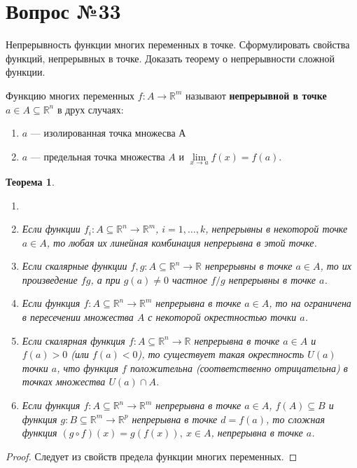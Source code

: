 \documentclass[12pt]{report}
\numberwithin{equation}{section}
\newtheorem{theorem}{Теорема}[section]
\begin{document}
\newpage \section{Вопрос №33} %
\begin{framed}
Непрерывность функции многих переменных в точке. Сформулировать свойства функций, непрерывных в точке. Доказать теорему о непрерывности сложной функции.
\end{framed}

Функцию многих переменных $f : A \to \mathbb{R}^m$ называют \textbf{непрерывной в точке} $a \in A \subseteq \mathbb{R}^n$ в друх случаях:
\begin{enumerate}
\item[1)] $a$ --- изолированная точка множесва А
\item[2)] $a$ --- предельная точка множества $A$ и $\lim\limits_{x \to a}f(x) = f(a).$
\end{enumerate}

\begin{theorem} \label{th:33:1}
\begin{enumerate}
\item[]
\item[а)] Если функции $f_i : A \subseteq \mathbb{R}^n \to \mathbb{R}^m$, $i = 1, \ldots, k$, непрерывны в некоторой точке $a \in A$, то любая их линейная комбинация непрерывна в этой точке.
\item[б)] Если скалярные функции $f,g : A \subseteq \mathbb{R}^n \to \mathbb{R}$ непрерывны в точке $a \in A$, то их произведение $fg$, а при $g(a) \neq 0$ частное $f/g$ непрерывны в точке $a$. 
\item[в)] Если функция $f : A \subseteq \mathbb{R}^n \to \mathbb{R}^m$ непрерывна в точке $a \in A$, то на ограничена в пересечении множества $A$ с некоторой окрестностью точки $a$.
\item[г)] Если скалярная функция  $f : A \subseteq \mathbb{R}^n \to \mathbb{R}$  непрерывна в точке $a \in A$ и $f(a) > 0$ (или $f(a) < 0$), то существует такая окрестность $U(a)$ точки $a$, что функция $f$ положительна (соответственно отрицательна) в точках множества $U(a) \cap A$. 
\item[д)] Если функция $f : A \subseteq  \mathbb{R}^n \to \mathbb{R}^m$ непрерывна в точке $a \in A$, $f(A) \subseteq B$ и функция $g : B \subseteq \mathbb{R}^m \to \mathbb{R}^p$ непрерывна в точке $d = f(a)$, то сложная функция $(g \circ f)(x) = g(f(x)),~x \in A $, непрерывна в точке $a$.
\end{enumerate}
\end{theorem}
\begin{proof} Следует из свойств предела функции многих переменных.
\end{proof}
\end{document}
